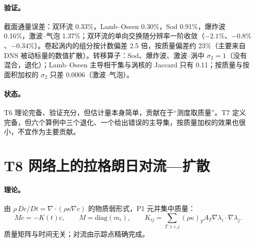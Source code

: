 \paragraph{验证。}截面通量误差：双环流 0.33\%，Lamb–Oseen 0.30\%，Sod 0.91\%，爆炸波 0.16\%，激波–气泡 1.37\%；双环流的单向交换随分辨率一阶收敛（$-2.1\%$、$-0.8\%$、$-0.34\%$）。卷起涡内的组分按计数偏差 2.5 倍，按质量偏差约 23\%（主要来自 DNS 被动标量的数值扩散）。转移算子：Sod、爆炸波、激波–涡中 $\sigma_2=1$（没有混合，退化）；Lamb–Oseen 主导相干集与涡核的 Jaccard 只有 0.11；按质量与按面积加权的 $\sigma_2$ 只差 0.0006（激波–气泡）。

\paragraph{状态。}T6 理论完备、验证充分，但估计量本身简单，贡献在于“测度取质量”。T7 定义完备，但六个算例中三个退化、一个给出错误的主导集，按质量加权的效果也很小，不宜作为主要贡献。

\section{T8 网络上的拉格朗日对流—扩散}

\paragraph{理论。}由 $\rho\,Dc/Dt=\nabla\cdot(\rho\kappa\nabla c)$ 的物质弱形式，P1 元并集中质量：
\begin{equation}
M\dot c=-K(t)c,\qquad M=\mathrm{diag}(m_i),\qquad K_{ij}=\sum_{T\ni i,j}(\rho\kappa)_TA_T\nabla\lambda_i\cdot\nabla\lambda_j .
\end{equation}
质量矩阵与时间无关；对流由示踪点精确完成。


